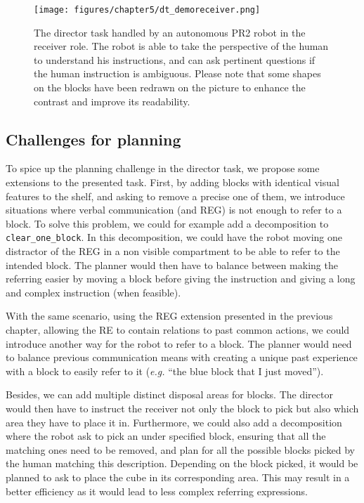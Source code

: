 \documentclass[a4paper,11pt,twoside]{StyleThese}
\begin{document}
\begin{figure}[hbtp]
\centering
\texttt{[image: figures/chapter5/dt\_demoreceiver.png]}
\caption{The director task handled by an autonomous PR2 robot in the receiver role. The robot is able to take the perspective of the human to understand his instructions, and can ask pertinent questions if the human instruction is ambiguous. Please note that some shapes on the blocks have been redrawn on the picture to enhance the contrast and improve its readability.}
\label{fig:chap5dtdemoreceiver}
\end{figure}

\subsection{Challenges for planning}
To spice up the planning challenge in the director task, we propose some extensions to the presented task.
First, by adding blocks with identical visual features to the shelf, and asking to remove a precise one of them, we introduce situations where verbal communication (and REG) is not enough to refer to a block. To solve this problem, we could for example add a decomposition to \verb'clear_one_block'. In this decomposition, we could have the robot moving one distractor of the REG in a non visible compartment to be able to refer to the intended block. The planner would then have to balance between making the referring easier by moving a block before giving the instruction and giving a long and complex instruction (when feasible).

With the same scenario, using the REG extension presented in the previous chapter, allowing the RE to contain relations to past common actions, we could introduce another way for the robot to refer to a block. The planner would need to balance previous communication means with creating a unique past experience with a block to easily refer to it (\textit{e.g.} ``the blue block that I just moved'').

Besides, we can add multiple distinct disposal areas for blocks. The director would then have to instruct the receiver not only the block to pick but also which area they have to place it in. Furthermore, we could also add a decomposition where the robot ask to pick an under specified block, ensuring that all the matching ones need to be removed, and plan for all the possible blocks picked by the human matching this description. Depending on the block picked, it would be planned to ask to place the cube in its corresponding area. This may result in a better efficiency as it would lead to less complex referring expressions.
\end{document}
